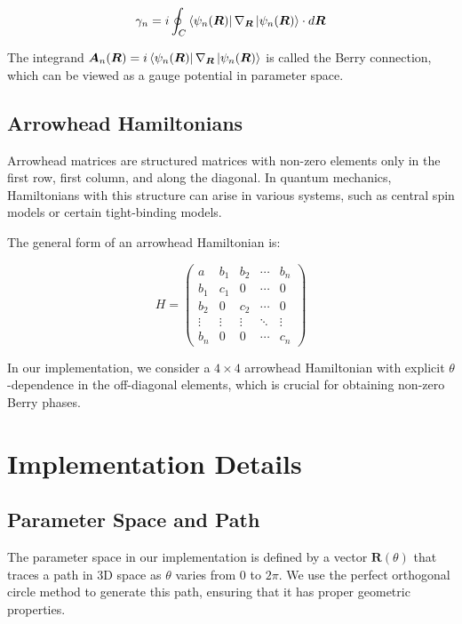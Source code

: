 \documentclass[12pt,a4paper]{article}
\begin{document}
\begin{equation}
\gamma_n = i \oint_C \bra{\psi_n(\bm{R})} \nabla_{\bm{R}} \ket{\psi_n(\bm{R})} \cdot d\bm{R}
\end{equation}

The integrand $\bm{A}_n(\bm{R}) = i \bra{\psi_n(\bm{R})} \nabla_{\bm{R}} \ket{\psi_n(\bm{R})}$ is called the Berry connection, which can be viewed as a gauge potential in parameter space.

\subsection{Arrowhead Hamiltonians}

Arrowhead matrices are structured matrices with non-zero elements only in the first row, first column, and along the diagonal. In quantum mechanics, Hamiltonians with this structure can arise in various systems, such as central spin models or certain tight-binding models.

The general form of an arrowhead Hamiltonian is:

\begin{equation}
H = \begin{pmatrix}
a & b_1 & b_2 & \cdots & b_n \\
b_1 & c_1 & 0 & \cdots & 0 \\
b_2 & 0 & c_2 & \cdots & 0 \\
\vdots & \vdots & \vdots & \ddots & \vdots \\
b_n & 0 & 0 & \cdots & c_n
\end{pmatrix}
\end{equation}

In our implementation, we consider a $4 \times 4$ arrowhead Hamiltonian with explicit $\theta$-dependence in the off-diagonal elements, which is crucial for obtaining non-zero Berry phases.

\section{Implementation Details}

\subsection{Parameter Space and Path}

The parameter space in our implementation is defined by a vector $\bm{R}(\theta)$ that traces a path in 3D space as $\theta$ varies from 0 to $2\pi$. We use the perfect orthogonal circle method to generate this path, ensuring that it has proper geometric properties.
\end{document}

